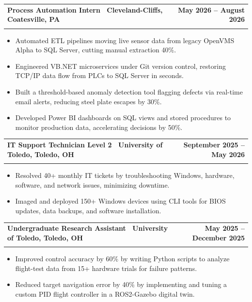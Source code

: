 \documentclass[letterpaper,11pt]{article}
\makeatletter
\newcommand{\resumeItem}[1]{\item\small{#1 \vspace{-4pt}}}
\newcommand{\resumeSubheading}[4]{
    \vspace{-2pt}\item
    \begin{tabular*}{1.0\textwidth}[t]{l@{\extracolsep{\fill}}r}
        \textbf{#1} & \textbf{\small #2} \\
        \textit{\small#3} & \textit{\small #4}
    \end{tabular*}\vspace{-7pt}
}
\newcommand{\resumeItemListStart}{\begin{itemize}}
\newcommand{\resumeItemListEnd}{\end{itemize}\vspace{-7pt}}
\makeatother
\begin{document}
\resumeSubheading
{\textbf{Process Automation Intern} \textnormal{\textbar\ Cleveland-Cliffs, Coatesville, PA}}{May 2026 -- August 2026}
{}{}
\vspace{-0.6cm}
\resumeItemListStart

\resumeItem{Automated ETL pipelines moving live sensor data from legacy OpenVMS Alpha to SQL Server, cutting manual extraction 40\%.}

\vspace{0.15cm}

\resumeItem{Engineered VB.NET microservices under Git version control, restoring TCP/IP data flow from PLCs to SQL Server in seconds.}
\vspace{0.15cm}


\resumeItem{Built a threshold-based anomaly detection tool flagging defects via real-time email alerts, reducing steel plate escapes by 30\%.}
\vspace{0.15cm}


\resumeItem{Developed Power BI dashboards on SQL views and stored procedures to monitor production data, accelerating decisions by 50\%.}



\vspace{0.15cm}
\resumeItemListEnd
\resumeSubheading
{\textbf{IT Support Technician Level 2} \textnormal{\textbar\ University of Toledo, Toledo, OH}}{September 2025 -- May 2026}
{}{}
\vspace{-0.6cm}
\resumeItemListStart

\resumeItem{Resolved 40+ monthly IT tickets by troubleshooting Windows, hardware, software, and network issues, minimizing downtime.}

\vspace{0.15cm}
\resumeItem{Imaged and deployed 150+ Windows devices using CLI tools for BIOS updates, data backups, and software installation.}

\vspace{0.15cm}

\resumeItemListEnd

\resumeSubheading
{\textbf{Undergraduate Research Assistant} \textnormal{\textbar\ University of Toledo, Toledo, OH}}{May 2025 -- December 2025}
{}{}
\vspace{-0.6cm}
\resumeItemListStart
\resumeItem{Improved control accuracy by 60\% by writing Python scripts to analyze flight-test data from 15+ hardware trials for failure patterns.}
\vspace{0.15cm} 
\resumeItem{Reduced target navigation error by 40\% by implementing and tuning a custom PID flight controller in a ROS2-Gazebo digital twin.}
\resumeItemListEnd
\end{document}
